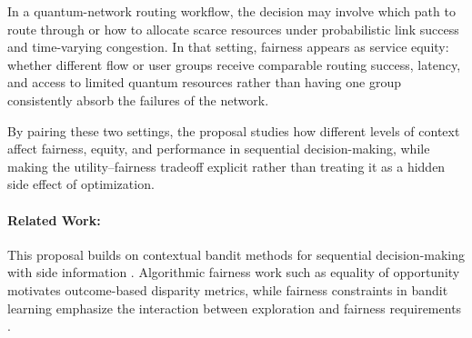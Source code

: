 \documentclass[11pt]{article}
\begin{document}
In a quantum-network routing workflow, the decision may involve which path to route through or how to allocate scarce resources under probabilistic link success and time-varying congestion. In that setting, fairness appears as service equity: whether different flow or user groups receive comparable routing success, latency, and access to limited quantum resources rather than having one group consistently absorb the failures of the network.

By pairing these two settings, the proposal studies how different levels of context affect fairness, equity, and performance in sequential decision-making, while making the utility--fairness tradeoff explicit rather than treating it as a hidden side effect of optimization.


\paragraph{Related Work:} \hspace{-5mm}
This proposal builds on contextual bandit methods for sequential decision-making with side information \cite{li2010contextual,abbasi2011linear}. Algorithmic fairness work such as equality of opportunity \cite{hardt2016equality} motivates outcome-based disparity metrics, while fairness constraints in bandit learning emphasize the interaction between exploration and fairness requirements \cite{joseph2016fairness,chen2020fair}.


\end{document}
